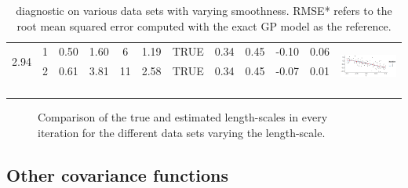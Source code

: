 \begin{table}
\begin{tabular}{ c c c c c c c c c c | c c}
\multirow{2}{*}{ 2.94} 
 & 1 & 0.50 & 1.60 & 6 & 1.19 & TRUE & 0.34 & 0.45 & -0.10 & 0.06 & \multirow{5}{*}{ \includegraphics[scale=0.20, trim = 0mm 10mm 0mm 3mm, clip]{fig9_diagnostic_8.png}}\\
 & 2 & 0.61 & 3.81 & 11 & 2.58 & TRUE & 0.34 & 0.45 & -0.07 & 0.01 & \\
 \\
 \\
 \\[1mm]
\arrayrulecolor{gray}\hline
\end{tabular}
\caption{diagnostic on various data sets with varying smoothness. RMSE* refers to the root mean squared error computed with the exact GP model as the reference.}
  \label{tab1_diagnostic}
\end{table}

\begin{figure}
\centering
{}
\caption{Comparison of the true and estimated length-scales in every iteration for the different data sets varying the length-scale.}
  \label{fig10_diagnostic_lscale_comparison}
\end{figure}

\subsection{Other covariance functions}

